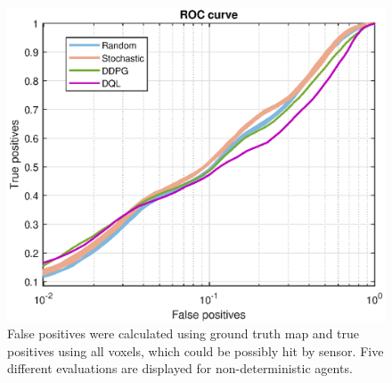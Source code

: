 \begin{figure}[h!]
\centering
\includegraphics[width=1\linewidth]{fig/roc.eps}
\caption[ROC curves comparison]{False positives were calculated using ground truth map and true positives using all voxels, which could be possibly hit by sensor. Five different evaluations are displayed for non-deterministic agents.}
\label{fig:roc}
\end{figure}

\clearpage


